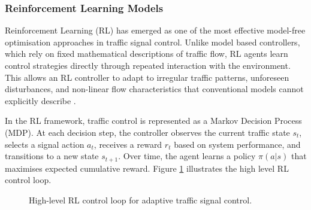 ﻿\documentclass[11pt, a4paper]{report}
\begin{document}
\subsubsection{Reinforcement Learning Models}

Reinforcement Learning (RL) has emerged as one of the most effective model-free optimisation approaches in traffic signal control. Unlike model based controllers, which rely on fixed mathematical descriptions of traffic flow, RL agents learn control strategies directly through repeated interaction with the environment. This allows an RL controller to adapt to irregular traffic patterns, unforeseen disturbances, and non-linear flow characteristics that conventional models cannot explicitly describe \cite{futuretransp5040137}.

In the RL framework, traffic control is represented as a Markov Decision Process (MDP). At each decision step, the controller observes the current traffic state $s_t$, selects a signal action $a_t$, receives a reward $r_t$ based on system performance, and transitions to a new state $s_{t+1}$. Over time, the agent learns a policy $\pi(a|s)$ that maximises expected cumulative reward. Figure \ref{fig:rl_overall_block} illustrates the high level RL control loop.

\begin{figure}[H]
\centering
{}
\caption{High-level RL control loop for adaptive traffic signal control.}
\label{fig:rl_overall_block}
\end{figure}
\end{document}
